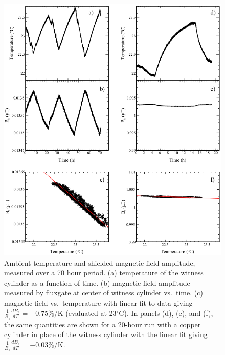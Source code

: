 \begin{figure}
  \begin{center}
    \includegraphics[width=\textwidth]{fig3.png}
    \caption[Ambient temperature and shielded magnetic field amplitude
    measurement]{Ambient temperature and shielded magnetic field
      amplitude, measured over a 70 hour period. (a) temperature of
      the witness cylinder as a function of time.  (b) magnetic field
      amplitude measured by fluxgate at center of witness cylinder
      vs.~time.  (c) magnetic field vs.~temperature with linear fit to
      data giving $\frac{1}{B_s}\frac{dB_s}{dT}=-0.75\%$/K (evaluated
      at 23$^\circ$C).  In panels (d), (e), and (f), the same
      quantities are shown for a 20-hour run with a copper cylinder in
      place of the witness cylinder with the linear fit giving
      $\frac{1}{B_s}\frac{dB_s}{dT}=-0.03\%$/K.}
    \label{fig:B_vs_Temp}
  \end{center}
\end{figure} 


